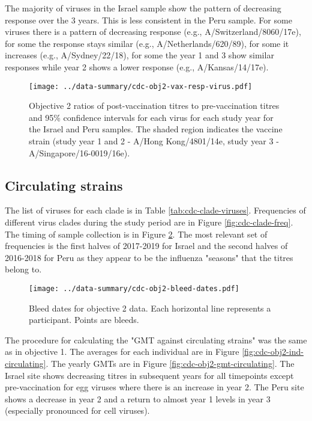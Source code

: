 \documentclass[12pt]{article}
\begin{document}
The majority of viruses in the Israel sample show the pattern of decreasing response over the 3 years. This is less consistent in the Peru sample. For some viruses
there is a pattern of decreasing response (e.g., A/Switzerland/8060/17e), for some the response stays similar (e.g., A/Netherlands/620/89), for some it increases
(e.g., A/Sydney/22/18), for some the year 1 and 3 show similar responses while
year 2 shows a lower response (e.g., A/Kansas/14/17e).

\begin{figure}
	\texttt{[image: ../data-summary/cdc-obj2-vax-resp-virus.pdf]}
	\caption{Objective 2 ratios of post-vaccination titres to pre-vaccination titres and 95\% confidence intervals for each virus for each study year for the Israel and Peru samples. The shaded region indicates the vaccine strain (study year 1 and 2 - A/Hong Kong/4801/14e, study year 3 - A/Singapore/16-0019/16e).}
	\label{fig:cdc-obj2-vax-resp-virus}
\end{figure}

\subsection{Circulating strains}

The list of viruses for each clade is in Table \ref{tab:cdc-clade-viruses}. Frequencies of different virus clades during the study period are in Figure \ref{fig:cdc-clade-freq}. The timing of sample collection is in Figure \ref{fig:cdc-obj2-bleed-dates}. The most relevant set of frequencies is the first halves of 2017-2019 for Israel and the second halves of 2016-2018 for Peru as they appear to be the influenza "seasons" that the titres belong to.

\begin{figure}
	\texttt{[image: ../data-summary/cdc-obj2-bleed-dates.pdf]}
	\caption{Bleed dates for objective 2 data. Each horizontal line represents a participant. Points are bleeds.}
	\label{fig:cdc-obj2-bleed-dates}
\end{figure}

The procedure for calculating the "GMT against circulating strains" was the same as in objective 1. The averages for each individual are in Figure \ref{fig:cdc-obj2-ind-circulating}. The yearly GMTs are in Figure \ref{fig:cdc-obj2-gmt-circulating}. The Israel site shows decreasing titres in subsequent years for all timepoints except pre-vaccination for egg viruses where there is an increase in year 2. The Peru site shows a decrease in year 2 and a return to almost year 1 levels in year 3 (especially pronounced for cell viruses).
\end{document}
